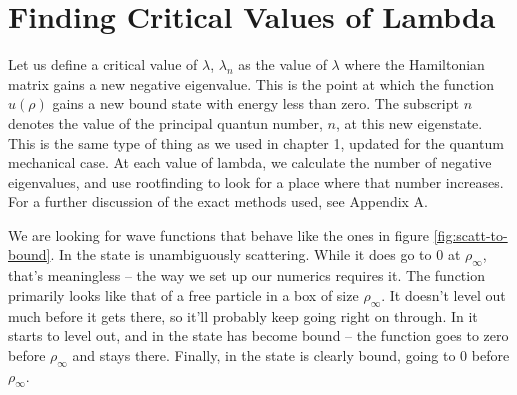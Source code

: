 \documentclass[12pt,twoside]{reedthesis}
\begin{document}
\section{Finding Critical Values of Lambda}
Let us define a critical value of $\lambda$, $\lambda_n$ as the value of $\lambda$ where the Hamiltonian matrix gains a new negative eigenvalue. This is the point at which the function $u(\rho)$ gains a new bound state with energy less than zero. The subscript $n$ denotes the value of the principal quantun number, $n$, at this new eigenstate. This is the same type of thing as we used in chapter 1, updated for the quantum mechanical case.
At each value of lambda, we calculate the number of negative eigenvalues, and use rootfinding to look for a place where that number increases. For a further discussion of the exact methods used, see Appendix A.

We are looking for wave functions that behave like the ones in figure \ref{fig:scatt-to-bound}. In  the state is unambiguously scattering. While it does go to 0 at $\rho_{\infty}$, that's meaningless -- the way we set up our numerics requires it.
The function primarily looks like that of a free particle in a box of size $\rho_{\infty}$. 
 It doesn't level out much before it gets there, so it'll probably keep going right on through. In  it starts to level out, and in  the state has become bound -- the function goes to zero before $\rho_{\infty}$ and stays there. Finally, in  the state is clearly bound, going to 0 before $\rho_{\infty}$. 
\end{document}
